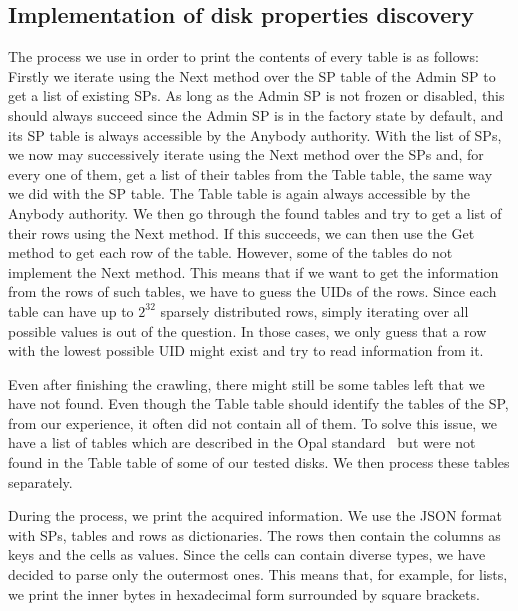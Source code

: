 \subsection{Implementation of disk properties discovery}

The process we use in order to print the contents of every table is as follows:
Firstly we iterate using the Next method over the SP table of the Admin SP to get a list of existing SPs. As long as the Admin SP is not frozen or disabled, this should always succeed since the Admin SP is in the factory state by default, and its SP table is always accessible by the Anybody authority. 
With the list of SPs, we now may successively iterate using the Next method over the SPs and, for every one of them, get a list of their tables from the Table table, the same way we did with the SP table. The Table table is again always accessible by the Anybody authority.
We then go through the found tables and try to get a list of their rows using the Next method. If this succeeds, we can then use the Get method to get each row of the table. However, some of the tables do not implement the Next method. This means that if we want to get the information from the rows of such tables, we have to guess the UIDs of the rows. Since each table can have up to $2^{32}$ sparsely distributed rows, simply iterating over all possible values is out of the question. In those cases, we only guess that a row with the lowest possible UID might exist and try to read information from it.

Even after finishing the crawling, there might still be some tables left that we have not found. Even though the Table table should identify the tables of the SP, from our experience, it often did not contain all of them. To solve this issue, we have a list of tables which are described in the Opal standard~\cite{tcg-opal2} but were not found in the Table table of some of our tested disks. We then process these tables separately.

During the process, we print the acquired information. We use the JSON format with SPs, tables and rows as dictionaries. The rows then contain the columns as keys and the cells as values. Since the cells can contain diverse types, we have decided to 
parse only the outermost ones. This means that, for example, for lists, we print the inner bytes in hexadecimal form surrounded by square brackets.




